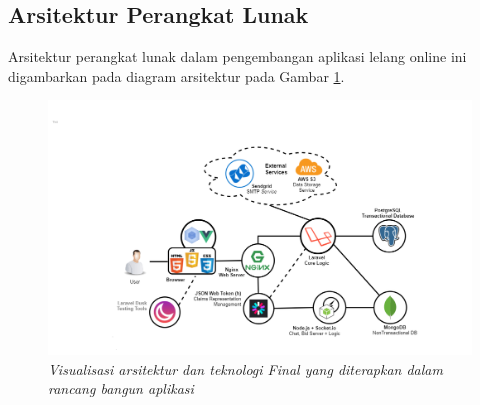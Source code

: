 
\subsection{Arsitektur Perangkat Lunak}
	\label{final-arch-tech}
	Arsitektur perangkat lunak dalam pengembangan aplikasi lelang online ini digambarkan pada diagram arsitektur pada Gambar \ref{final-arch-tech-figure}.
	\newpage
	
	\begin{landscape}
		\begin{figure}[H]
			\centering
			\includegraphics[height=\textheight]{images/bab3/arsitektur-app.png}
			\caption{\textit{Visualisasi arsitektur dan teknologi Final yang diterapkan dalam rancang bangun aplikasi}}
			\label{final-arch-tech-figure}
		\end{figure}
	\end{landscape}
	
	
